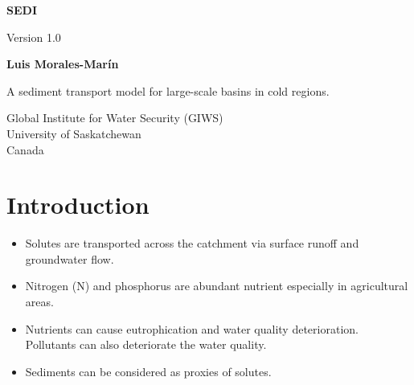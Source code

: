 \documentclass[12pt, letterpaper]{article}
\begin{document}
\begin{titlepage}

    \begin{center}
        \vspace*{1cm}

        \Huge
        \textbf{SEDI}

        \vspace{0.5cm}
        \LARGE
        Version 1.0

        \vspace{1.5cm}

        \textbf{Luis Morales-Mar\'{i}n}

        \vfill

        A sediment transport model for large-scale basins in cold regions.

        \vspace{0.8cm}


        \Large
        Global Institute for Water Security (GIWS)\\
        University of Saskatchewan\\
        Canada\\
        \date{\today}

    \end{center}
\end{titlepage}

\begin{tableofcontents}
\tableofcontents
\end{tableofcontents}

\section{Introduction}
\begin{itemize}
  \item Solutes are transported across the catchment via surface runoff and groundwater flow.
  \item Nitrogen (N) and phosphorus are abundant nutrient especially in agricultural areas.
  \item Nutrients can cause eutrophication and water quality deterioration. Pollutants can also deteriorate the water quality.
  \item Sediments can be considered as proxies of solutes.
\end{itemize}
\end{document}
